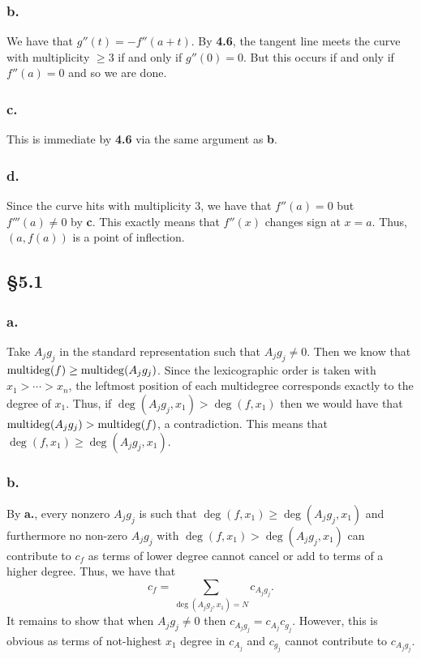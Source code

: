 \documentclass[letterpaper]{article}
\begin{document}
\subsubsection*{b.}

We have that $g''(t) = -f''(a + t)$.
By \textbf{4.6}, the tangent line meets the curve with multiplicity $\geq 3$ if and only if $g''(0) = 0$.
But this occurs if and only if $f''(a) = 0$ and so we are done.

\subsubsection*{c.}

This is immediate by \textbf{4.6} via the same argument as \textbf{b}.

\subsubsection*{d.}

Since the curve hits with multiplicity $3$, we have that $f''(a) = 0$ but $f'''(a) \neq 0$ by \textbf{c}.
This exactly means that $f''(x)$ changes sign at $x = a$.
Thus, $(a, f(a))$ is a point of inflection.

\clearpage

\subsection*{\S 5.1}

\subsubsection*{a.}

Take $A_{j}g_{j}$ in the standard representation such that $A_{j} g_{j} \neq 0$.
Then we know that $\operatorname{multideg}(f) \geq \operatorname{multideg}(A_{j}g_{j})$.
Since the lexicographic order is taken with $x_{1} > \cdots > x_{n}$, the leftmost position of each multidegree corresponds exactly to the degree of $x_{1}$.
Thus, if $\deg(A_{j}g_{j}, x_{1}) > \deg(f, x_{1})$ then we would have that $\operatorname{multideg}(A_{j}g_{j}) > \operatorname{multideg}(f)$, a contradiction.
This means that $\deg(f, x_{1}) \geq \deg(A_{j}g_{j}, x_{1})$.

\subsubsection*{b.}

By \textbf{a.}, every nonzero $A_{j}g_{j}$ is such that $\deg(f, x_{1}) \geq \deg(A_{j}g_{j}, x_{1})$ and furthermore no non-zero $A_{j}g_{j}$ with $\deg(f, x_{1}) > \deg(A_{j}g_{j}, x_{1})$ can contribute to $c_{f}$ as terms of lower degree cannot cancel or add to terms of a higher degree.
Thus, we have that
\[
  c_{f} = \sum_{\deg(A_{j}g_{j}, x_{1}) = N} c_{A_{j}g_{j}}.
\]
It remains to show that when $A_{j}g_{j} \neq 0$ then $c_{A_{j}g_{j}} = c_{A_{j}} c_{g_{j}}$.
However, this is obvious as terms of not-highest $x_{1}$ degree in $c_{A_{j}}$ and $c_{g_{j}}$ cannot contribute to $c_{A_{j}g_{j}}$.
\end{document}
